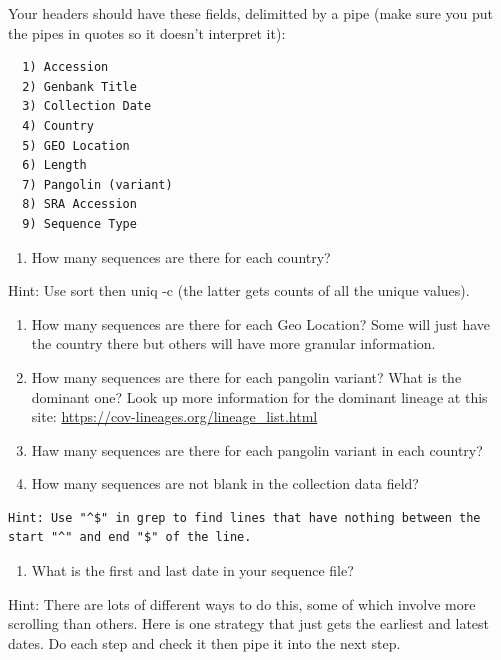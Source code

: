 \documentclass[
]{book}
\providecommand{\tightlist}{%
  \setlength{\itemsep}{0pt}\setlength{\parskip}{0pt}}
\begin{document}
Your headers should have these fields, delimitted by a pipe (make sure you put the pipes in quotes so it doesn't interpret it):

\begin{verbatim}
  1) Accession
  2) Genbank Title
  3) Collection Date
  4) Country
  5) GEO Location
  6) Length
  7) Pangolin (variant)
  8) SRA Accession
  9) Sequence Type
\end{verbatim}

\begin{enumerate}
\def\labelenumi{\arabic{enumi}.}
\setcounter{enumi}{3}
\tightlist
\item
  How many sequences are there for each country?
\end{enumerate}

Hint: Use sort then uniq -c (the latter gets counts of all the unique values).

\begin{enumerate}
\def\labelenumi{\arabic{enumi}.}
\setcounter{enumi}{4}
\item
  How many sequences are there for each Geo Location? Some will just have the country there but others will have more granular information.
\item
  How many sequences are there for each pangolin variant? What is the dominant one? Look up more information for the dominant lineage at this site: \url{https://cov-lineages.org/lineage_list.html}
\item
  Haw many sequences are there for each pangolin variant in each country?
\item
  How many sequences are not blank in the collection data field?
\end{enumerate}

\begin{verbatim}
Hint: Use "^$" in grep to find lines that have nothing between the start "^" and end "$" of the line.
\end{verbatim}

\begin{enumerate}
\def\labelenumi{\arabic{enumi}.}
\setcounter{enumi}{8}
\tightlist
\item
  What is the first and last date in your sequence file?
\end{enumerate}

Hint: There are lots of different ways to do this, some of which involve more scrolling than others. Here is one strategy that just gets the earliest and latest dates. Do each step and check it then pipe it into the next step.
\end{document}

